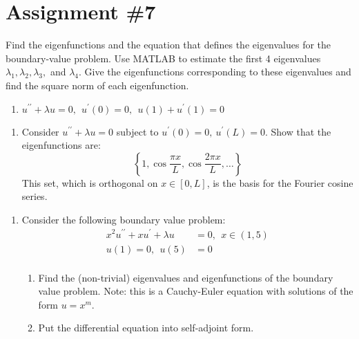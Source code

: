\chapter{Assignment \#7}
\label{ch:ass7}
\begin{fullwidth}
\noindent Find the eigenfunctions and the equation that defines the eigenvalues for the boundary-value problem.  Use MATLAB to estimate the first 4 eigenvalues $\lambda_1,\lambda_2,\lambda_3,$ and $\lambda_4.$  Give the eigenfunctions corresponding to these eigenvalues and find the square norm of each eigenfunction.

\begin{enumerate}
\item $u^{\prime \prime} + \lambda u = 0, \ \ u^{\prime}(0)=0, \ \ u(1)+u^{\prime}(1) = 0$

\end{enumerate}

\vspace{1.0cm}

\begin{enumerate}[resume]
\item Consider $u^{\prime \prime}+\lambda u = 0$ subject to $u^{\prime}(0)=0, \ u^{\prime}(L)=0$.  Show that the eigenfunctions are:
\begin{equation*}
\left\{ 1, \cos{\frac{\pi x}{L}},\cos{\frac{2\pi x}{L}}, \dots \right\}
\end{equation*}
This set, which is orthogonal on $x\in [0,L]$, is the basis for the Fourier cosine series.
\end{enumerate}

\vspace{1.0cm}

\begin{enumerate}[resume]
\item Consider the following boundary value problem:
\begin{align*}
x^2u^{\prime \prime}+xu^{\prime}+\lambda u &= 0, \ \ x\in(1,5) \\
u(1) = 0, \ \ u(5) &= 0 \\
\end{align*}
\begin{enumerate}
\item Find the (non-trivial) eigenvalues and eigenfunctions of the boundary value problem. Note: this is a Cauchy-Euler equation with solutions of the form $u=x^m$.  

\vspace{0.5cm}

\item Put the differential equation into self-adjoint form.


\end{enumerate}
\end{enumerate}
\end{fullwidth}
